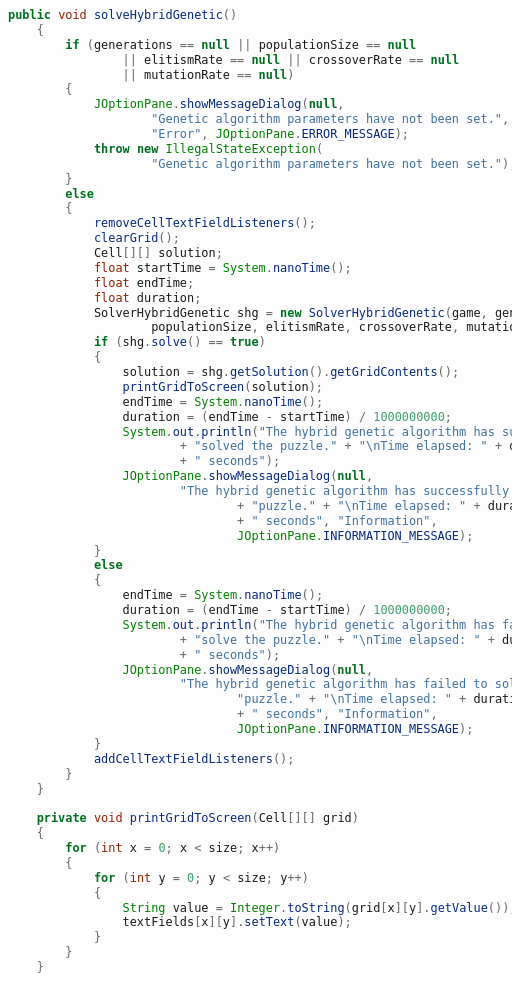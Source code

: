 \begin{lstlisting}[language=Java,basicstyle=\tiny,caption=GUI.java]
    public void solveHybridGenetic()
    {
        if (generations == null || populationSize == null 
                || elitismRate == null || crossoverRate == null 
                || mutationRate == null)
        {
            JOptionPane.showMessageDialog(null,
                    "Genetic algorithm parameters have not been set.",
                    "Error", JOptionPane.ERROR_MESSAGE);
            throw new IllegalStateException(
                    "Genetic algorithm parameters have not been set.");
        }
        else
        {
            removeCellTextFieldListeners();
            clearGrid();
            Cell[][] solution;
            float startTime = System.nanoTime();
            float endTime;
            float duration;
            SolverHybridGenetic shg = new SolverHybridGenetic(game, generations, 
                    populationSize, elitismRate, crossoverRate, mutationRate);
            if (shg.solve() == true)
            {
                solution = shg.getSolution().getGridContents();
                printGridToScreen(solution);
                endTime = System.nanoTime();
                duration = (endTime - startTime) / 1000000000;
                System.out.println("The hybrid genetic algorithm has successfully "
                        + "solved the puzzle." + "\nTime elapsed: " + duration 
                        + " seconds");
                JOptionPane.showMessageDialog(null, 
                        "The hybrid genetic algorithm has successfully solved the " 
                                + "puzzle." + "\nTime elapsed: " + duration 
                                + " seconds", "Information", 
                                JOptionPane.INFORMATION_MESSAGE);
            }
            else
            {
                endTime = System.nanoTime();
                duration = (endTime - startTime) / 1000000000;
                System.out.println("The hybrid genetic algorithm has failed to "
                        + "solve the puzzle." + "\nTime elapsed: " + duration 
                        + " seconds");
                JOptionPane.showMessageDialog(null, 
                        "The hybrid genetic algorithm has failed to solve the " + 
                                "puzzle." + "\nTime elapsed: " + duration 
                                + " seconds", "Information", 
                                JOptionPane.INFORMATION_MESSAGE);
            }
            addCellTextFieldListeners();
        }
    }
    
    private void printGridToScreen(Cell[][] grid)
    {
        for (int x = 0; x < size; x++)
        {
            for (int y = 0; y < size; y++)
            {
                String value = Integer.toString(grid[x][y].getValue());
                textFields[x][y].setText(value);
            }
        }
    }
    

\end{lstlisting}
